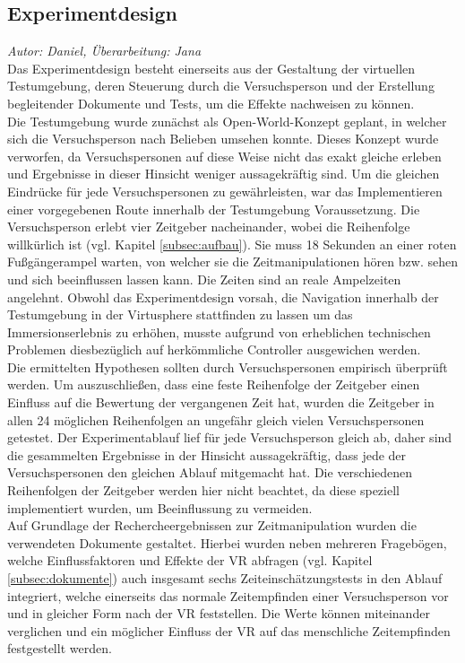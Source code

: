 \documentclass{Bericht}
\begin{document}
\subsection{Experimentdesign}
\textit{Autor: Daniel, Überarbeitung: Jana}\\
Das Experimentdesign besteht einerseits aus der Gestaltung der virtuellen Testumgebung, deren Steuerung durch die Versuchsperson und der Erstellung begleitender Dokumente und Tests, um die Effekte nachweisen zu können.\\
Die Testumgebung wurde zunächst als Open-World-Konzept geplant, in welcher sich die Versuchsperson nach Belieben umsehen konnte. Dieses Konzept wurde verworfen, da Versuchspersonen auf diese Weise nicht das exakt gleiche erleben und Ergebnisse in dieser Hinsicht weniger aussagekräftig sind. Um die gleichen Eindrücke für jede Versuchspersonen zu gewährleisten, war das Implementieren einer vorgegebenen Route innerhalb der Testumgebung Voraussetzung. Die Versuchsperson erlebt vier Zeitgeber nacheinander, wobei die Reihenfolge willkürlich ist (vgl. Kapitel \ref{subsec:aufbau}). Sie muss 18 Sekunden an einer roten Fußgängerampel warten, von welcher sie die Zeitmanipulationen hören bzw. sehen und sich beeinflussen lassen kann. Die Zeiten sind an reale Ampelzeiten angelehnt.
	Obwohl das Experimentdesign vorsah, die Navigation innerhalb der Testumgebung in der Virtusphere stattfinden zu lassen um das Immersionserlebnis zu erhöhen, musste aufgrund von erheblichen technischen Problemen diesbezüglich auf herkömmliche Controller ausgewichen werden.\\
	Die ermittelten Hypothesen sollten durch Versuchspersonen empirisch überprüft werden. Um auszuschließen, dass eine feste Reihenfolge der Zeitgeber einen Einfluss auf die Bewertung der vergangenen Zeit hat, wurden die Zeitgeber in allen 24 möglichen Reihenfolgen an ungefähr gleich vielen Versuchspersonen getestet. Der Experimentablauf lief für jede Versuchsperson gleich ab, daher sind die gesammelten Ergebnisse in der Hinsicht aussagekräftig, dass jede der Versuchspersonen den gleichen Ablauf mitgemacht hat. Die verschiedenen Reihenfolgen der Zeitgeber werden hier nicht beachtet, da diese speziell implementiert wurden, um Beeinflussung zu vermeiden.\\
Auf Grundlage der Rechercheergebnissen zur  Zeitmanipulation wurden die verwendeten Dokumente gestaltet. Hierbei wurden neben mehreren Fragebögen, welche Einflussfaktoren und Effekte der VR abfragen		 (vgl. Kapitel \ref{subsec:dokumente}) auch insgesamt sechs Zeiteinschätzungstests in den Ablauf integriert,
welche einerseits das normale Zeitempfinden einer Versuchsperson vor und in gleicher Form nach der VR feststellen. Die Werte können miteinander verglichen und ein möglicher Einfluss der VR auf das menschliche Zeitempfinden festgestellt werden.\\
\end{document}
